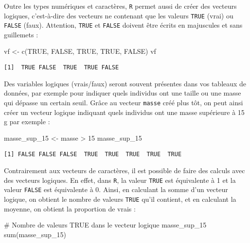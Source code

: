 \documentclass[
  a4paper,
  DIV=11,
  numbers=noendperiod,
  oneside]{scrreprt}
\newenvironment{Shaded}{}{}
\newcommand{\CommentTok}[1]{\textcolor[rgb]{0.42,0.45,0.49}{#1}}
\newcommand{\ConstantTok}[1]{\textcolor[rgb]{0.00,0.36,0.77}{#1}}
\newcommand{\DecValTok}[1]{\textcolor[rgb]{0.00,0.36,0.77}{#1}}
\newcommand{\FunctionTok}[1]{\textcolor[rgb]{0.44,0.26,0.76}{#1}}
\newcommand{\NormalTok}[1]{\textcolor[rgb]{0.14,0.16,0.18}{#1}}
\newcommand{\OtherTok}[1]{\textcolor[rgb]{0.44,0.26,0.76}{#1}}
\newcommand{\SpecialCharTok}[1]{\textcolor[rgb]{0.00,0.36,0.77}{#1}}
\begin{document}
Outre les types numériques et caractères, \texttt{R} permet aussi de
créer des vecteurs logiques, c'est-à-dire des vecteurs ne contenant que
les valeurs \texttt{TRUE} (vrai) ou \texttt{FALSE} (faux). Attention,
\texttt{TRUE} et \texttt{FALSE} doivent être écrits en majuscules et
sans guillemets :

\begin{Shaded}
\begin{Highlighting}[]
\NormalTok{vf }\OtherTok{\textless{}{-}} \FunctionTok{c}\NormalTok{(}\ConstantTok{TRUE}\NormalTok{, }\ConstantTok{FALSE}\NormalTok{, }\ConstantTok{TRUE}\NormalTok{, }\ConstantTok{TRUE}\NormalTok{, }\ConstantTok{FALSE}\NormalTok{)}
\NormalTok{vf}
\end{Highlighting}
\end{Shaded}

\begin{verbatim}
[1]  TRUE FALSE  TRUE  TRUE FALSE
\end{verbatim}

Des variables logiques (vrais/faux) seront souvent présentes dans vos
tableaux de données, par exemple pour indiquer quels individus ont une
taille ou une masse qui dépasse un certain seuil. Grâce au vecteur
\texttt{masse} créé plus tôt, on peut ainsi créer un vecteur logique
indiquant quels individus ont une masse supérieure à 15 g par exemple :

\begin{Shaded}
\begin{Highlighting}[]
\NormalTok{masse\_sup\_15 }\OtherTok{\textless{}{-}}\NormalTok{ masse }\SpecialCharTok{\textgreater{}} \DecValTok{15}
\NormalTok{masse\_sup\_15}
\end{Highlighting}
\end{Shaded}

\begin{verbatim}
[1] FALSE FALSE FALSE  TRUE  TRUE  TRUE  TRUE  TRUE
\end{verbatim}

Contrairement aux vecteurs de caractères, il est possible de faire des
calculs avec des vecteurs logiques. En effet, dans \texttt{R}, la valeur
\texttt{TRUE} est équivalente à 1 et la valeur \texttt{FALSE} est
équivalente à 0. Ainsi, en calculant la somme d'un vecteur logique, on
obtient le nombre de valeurs \texttt{TRUE} qu'il contient, et en
calculant la moyenne, on obtient la proportion de vrais :

\begin{Shaded}
\begin{Highlighting}[]
\CommentTok{\# Nombre de valeurs TRUE dans le vecteur logique masse\_sup\_15}
\FunctionTok{sum}\NormalTok{(masse\_sup\_15)}
\end{Highlighting}
\end{Shaded}
\end{document}
